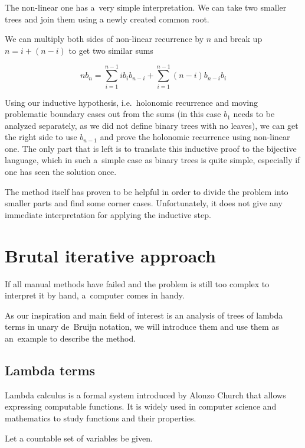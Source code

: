 \documentclass[final]{article}
\theoremstyle{definition}
\theoremstyle{definition}
\theoremstyle{remark}
\begin{document}
The non-linear one has a~very simple interpretation. We can take two smaller trees and join them using a newly created common root.

We can multiply both sides of non-linear recurrence by \(n\) and break up \(n = i + (n - i)\) to get two similar sums

\[n b_{n} = \sum_{i=1}^{n - 1} i b_{i} b_{n - i} + \sum_{i=1}^{n - 1} (n - i) b_{n - i} b_{i}\]

Using our inductive hypothesis, i.e.~holonomic recurrence and moving problematic boundary cases out from the sums (in this case \(b_{1}\) needs to be analyzed separately, as we did not define binary trees with no leaves), we can get the right side to use \(b_{n - 1}\) and prove the holonomic recurrence using non-linear one. The only part that is left is to translate this inductive proof to the bijective language, which in such a~simple case as binary trees is quite simple, especially if one has seen the solution once.

The method itself has proven to be helpful in order to divide the problem into smaller parts and find some corner cases. Unfortunately, it does not give any immediate interpretation for applying the inductive step.

\section{Brutal iterative approach}%
\label{sec:brutal_iterative_approach}

If all manual methods have failed and the problem is still too complex to interpret it by hand, a~computer comes in handy.

As our inspiration and main field of interest is an analysis of trees of lambda terms in unary de~Bruijn notation, we will introduce them and use them as an~example to describe the method.

\subsection{Lambda terms}%
\label{sub:lambda_terms}

Lambda calculus is a formal system introduced by Alonzo Church that allows expressing computable functions. It is widely used in computer science and mathematics to study functions and their properties.

Let a countable set of variables be given.
\end{document}
